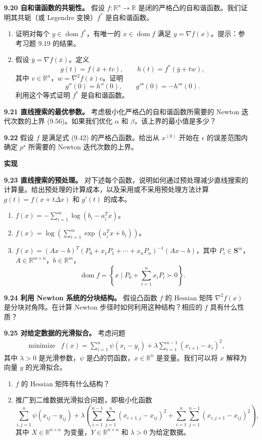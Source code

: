 \documentclass[UTF8, 12pt, fontset=fandol, oneside]{ctexart}
\begin{document}
\noindent\textbf{9.20 自和谐函数的共轭性。}\quad
假设 $f:\mathbb{R}^n\to\mathbb{R}$ 是闭的严格凸的自和谐函数。我们证明其共轭（或 Legendre 变换）$f^\ast$ 是自和谐函数。
\begin{enumerate}
\item[(a)] 证明对每个 $y\in\operatorname{dom} f^\ast$，有唯一的 $x\in\operatorname{dom} f$ 满足 $y=\nabla f(x)$。提示：参考习题 9.19 的结果。
\item[(b)] 假设 $\bar y=\nabla f(\bar x)$。定义
\[
g(t)=f(\bar x+tv),\qquad h(t)=f^\ast(\bar y+tw),
\]
其中 $v\in\mathbb{R}^n$，$w=\nabla^2 f(\bar x)v$。证明
\[
g''(0)=h''(0),\qquad g'''(0)=-h'''(0).
\]
利用这个等式证明 $f^\ast$ 是自和谐函数。
\end{enumerate}

\noindent\textbf{9.21 直线搜索的最优参数。}\quad
考虑极小化严格凸的自和谐函数所需要的 Newton 迭代次数的上界 (9.56)。如果我们优化 $\alpha$ 和 $\beta$，该上界的最小值是多少？

\noindent\textbf{9.22}\quad
假设 $f$ 是满足式 (9.42) 的严格凸函数。给出从 $x^{(0)}$ 开始在 $\epsilon$ 的误差范围内确定 $p^\star$ 所需要的 Newton 迭代次数的上界。

\noindent\textbf{实现}

\noindent\textbf{9.23 直线搜索的预处理。}\quad
对下述每个函数，说明如何通过预处理减少直线搜索的计算量。给出预处理的计算成本，以及采用或不采用预处理方法计算 $g(t)=f(x+t\Delta x)$ 和 $g'(t)$ 的成本。
\begin{enumerate}
\item[(a)] $f(x)=-\sum_{i=1}^m\log(b_i-a_i^Tx)$。
\item[(b)] $f(x)=\log\left(\sum_{i=1}^m\exp(a_i^Tx+b_i)\right)$。
\item[(c)] $f(x)=(Ax-b)^T(P_0+x_1P_1+\cdots+x_nP_n)^{-1}(Ax-b)$，其中 $P_i\in\mathbf{S}^m$，$A\in\mathbb{R}^{m\times n}$，$b\in\mathbb{R}^m$，
\[
\operatorname{dom} f=\left\{x\mid P_0+\sum_{i=1}^n x_iP_i\succ0\right\}.
\]
\end{enumerate}

\noindent\textbf{9.24 利用 Newton 系统的分块结构。}\quad
假设凸函数 $f$ 的 Hessian 矩阵 $\nabla^2 f(x)$ 是分块对角阵。在计算 Newton 步径时如何利用这种结构？相应的 $f$ 具有什么性质？

\noindent\textbf{9.25 对给定数据的光滑拟合。}\quad
考虑问题
\[
\begin{array}{ll}
\mbox{minimize} & f(x)=\displaystyle\sum_{i=1}^n\psi(x_i-y_i)+\lambda\sum_{i=1}^{n-1}(x_{i+1}-x_i)^2,
\end{array}
\]
其中 $\lambda>0$ 是光滑参数，$\psi$ 是凸的罚函数，$x\in\mathbb{R}^n$ 是变量。我们可以将 $x$ 解释为向量 $y$ 的光滑拟合。
\begin{enumerate}
\item[(a)] $f$ 的 Hessian 矩阵有什么结构？
\item[(b)] 推广到二维数据光滑拟合问题，即极小化函数
\[
\sum_{i,j=1}^n\psi(x_{ij}-y_{ij})+\lambda\left(
\sum_{i=1}^{n-1}\sum_{j=1}^n(x_{i+1,j}-x_{ij})^2+
\sum_{i=1}^n\sum_{j=1}^{n-1}(x_{i,j+1}-x_{ij})^2\right),
\]
其中 $X\in\mathbb{R}^{n\times n}$ 为变量，$Y\in\mathbb{R}^{n\times n}$ 和 $\lambda>0$ 为给定数据。
\end{enumerate}
\end{document}
